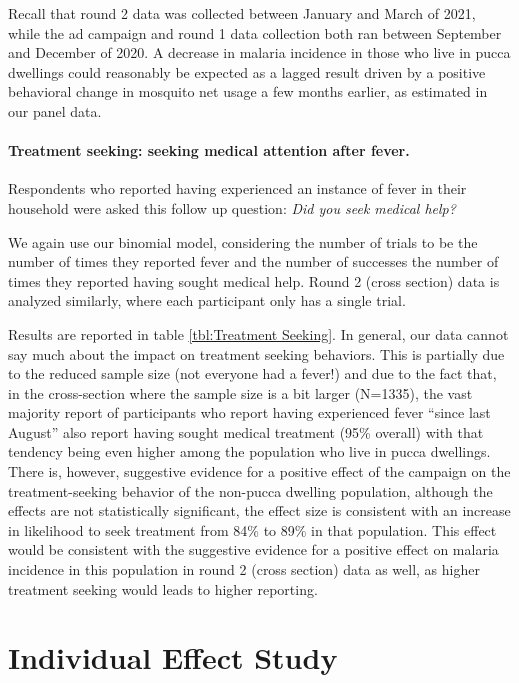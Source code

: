 \documentclass[a4paper,12pt]{article}
\theoremstyle{proposition}
\begin{document}
Recall that round 2 data was collected between January and March of 2021, while the ad campaign and round 1 data collection both ran between September and December of 2020. A decrease in malaria incidence in those who live in pucca dwellings could reasonably be expected as a lagged result driven by a positive behavioral change in mosquito net usage a few months earlier, as estimated in our panel data.




\paragraph{Treatment seeking: seeking medical attention after fever.} Respondents who reported having experienced an instance of fever in their household were asked this follow up question: \textit{Did you seek medical help?}

We again use our binomial model, considering the number of trials to be the number of times they reported fever and the number of successes the number of times they reported having sought medical help. Round 2 (cross section) data is analyzed similarly, where each participant only has a single trial.

Results are reported in table \ref{tbl:Treatment Seeking}. In general, our data cannot say much about the impact on treatment seeking behaviors. This is partially due to the reduced sample size (not everyone had a fever!) and due to the fact that, in the cross-section where the sample size is a bit larger (N=1335), the vast majority report of participants who report having experienced fever ``since last August'' also report having sought medical treatment (95\% overall) with that tendency being even higher among the population who live in pucca dwellings. There is, however, suggestive evidence for a positive effect of the campaign on the treatment-seeking behavior of the non-pucca dwelling population, although the effects are not statistically significant, the effect size is consistent with an increase in likelihood to seek treatment from 84\% to 89\% in that population. This effect would be consistent with the suggestive evidence for a positive effect on malaria incidence in this population in round 2 (cross section) data as well, as higher treatment seeking would leads to higher reporting.





\section{Individual Effect Study}
\end{document}
